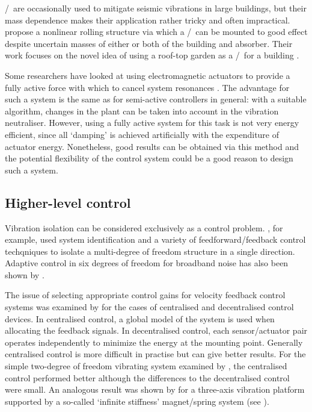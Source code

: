 \Vibneut/\ are occasionally used to mitigate seismic vibrations in large buildings, but their mass dependence makes their application rather tricky and often impractical.
\textcite{matta2008} propose a nonlinear rolling structure via which a \vibneut/\ can be mounted to good effect despite uncertain masses of either or both of the building and absorber.
Their work focuses on the novel idea of using a roof-top garden as a \vibneut/\ for a building \cite{matta2008a}.

Some researchers have looked at using electromagnetic actuators to provide a fully active force with which to cancel system resonances \cite{chen2005a,wu2007,kim2008a}.
The advantage for such a system is the same as for semi-active controllers in general: with a suitable algorithm, changes in the plant can be taken into account in the vibration neutraliser.
However, using a fully active system for this task is not very energy efficient, since all `damping' is achieved artificially with the expenditure of actuator energy.
Nonetheless, good results can be obtained via this method and the potential flexibility of the control system could be a good reason to design such a system.

\subsection{Higher-level control}

Vibration isolation can be considered exclusively as a control problem. 
\textcite{guo2005}, for example, used system identification and a variety of feedforward/feedback control techqniques to isolate a multi-degree of freedom structure in a single direction.
Adaptive control in six degrees of freedom for broadband noise has also been shown by \textcite{duindam2005}.

The issue of selecting appropriate control gains for velocity feedback control systems was examined by \textcite{engels2008} for the cases of centralised and decentralised control devices.
In centralised control, a global model of the system is used when allocating the feedback signals.
In decentralised control, each sensor/actuator pair operates independently to minimize the energy at the mounting point.
Generally centralised control is more difficult in practise but can give better results.
For the simple two-degree of freedom vibrating system examined by \textcite{engels2008}, the centralised control performed better although the differences to the decentralised control were small.
An analogous result was shown by \textcite{hoque2006} for a three-axis vibration platform supported by a so-called `infinite stiffness' magnet/spring system (see ).


